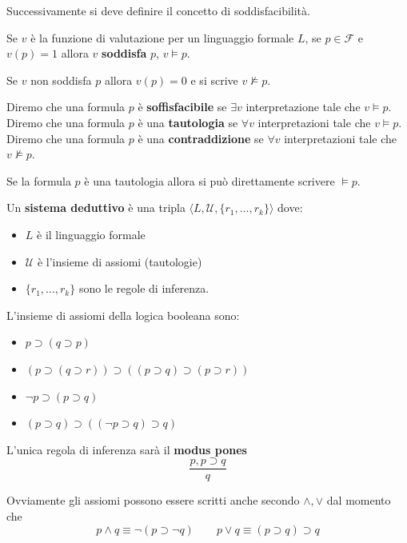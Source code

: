 Successivamente si deve definire il concetto di soddisfacibilità.

\begin{definizione} 
    Se $v$ è la funzione di valutazione per un linguaggio formale $L$, se $p\in \mathcal{F}$
    e $v(p) = 1$ allora $v$ \textbf{soddisfa} $p$, $v\vDash p$.
\end{definizione}

Se $v$ non soddisfa $p$ allora $v(p) = 0$ e si scrive $v\not\vDash p$.

Diremo che una formula $p$ è \textbf{soffisfacibile} se $\exists v$ interpretazione 
tale che $v\vDash p$. Diremo che una formula $p$ è una \textbf{tautologia} se $\forall v$ interpretazioni
tale che $v\vDash p$. Diremo che una formula $p$ è una \textbf{contraddizione} se $\forall v$ interpretazioni
tale che $v\not \vDash p$.

\begin{nota}
    Se la formula $p$ è una tautologia allora si può direttamente scrivere $\vDash p$.
\end{nota}

\begin{definizione} 
    Un \textbf{sistema deduttivo} è una tripla $\langle L, \mathcal{U}, \{r_1,\dots, r_k\}\rangle$
    dove:
    \begin{itemize}
        \item $L$ è il linguaggio formale
        \item $\mathcal{U}$ è l'insieme di assiomi (tautologie)
        \item $\{r_1,\dots, r_k\}$ sono le regole di inferenza.
    \end{itemize}
\end{definizione}

L'insieme di assiomi della logica booleana sono:
\begin{itemize}
    \item $p\supset (q \supset p)$
    \item $(p\supset (q \supset r))\supset ((p\supset q)\supset (p\supset r))$
    \item $\lnot p \supset(p\supset q)$
    \item $(p\supset q) \supset((\lnot p\supset q)\supset q)$
\end{itemize}

L'unica regola di inferenza sarà il \textbf{modus pones}
$$\frac{p,p\supset q}{q}$$

Ovviamente gli assiomi possono essere scritti anche secondo $\land,\lor$ dal momento 
che 
$$p\land q \equiv \lnot(p\supset \lnot q) \qquad p\lor q \equiv (p\supset q )\supset q$$

